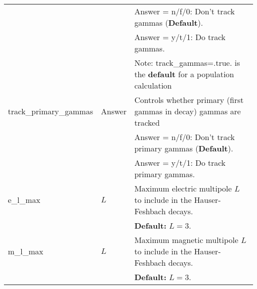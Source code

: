 \documentclass[
10pt,
showpacs,preprintnumbers,nofootinbib,
amsmath,amssymb,
aps,prc,groupedaddress,superscriptaddress,
notitlepage,showkeys
]{revtex4-1}
\begin{document}
\begin{center}
\begin{tabular}{| p{4cm} | p{4 cm} | p{9 cm} |}
 & &   Answer = n/f/0:  Don't track gammas  ({\bf Default}).\\
  & &  Answer = y/t/1:  Do track gammas.\\
 &  &  Note: track\_gammas=.true. is the {\bf default} for a population calculation\\
\hline
track\_primary\_gammas  & Answer  &      Controls whether primary (first gammas in decay) gammas are tracked \\
 & &    Answer = n/f/0:  Don't track primary gammas  ({\bf Default}).\\
 & &    Answer = y/t/1:  Do track primary gammas.\\
\hline
e\_l\_max & $L$ & Maximum electric multipole $L$ to include in the Hauser-Feshbach decays.\\
& & {\bf Default:} $L=3$.\\
\hline
m\_l\_max & $L$ & Maximum magnetic multipole $L$ to include in the Hauser-Feshbach decays.\\
& & {\bf Default:} $L=3$.\\
\hline
\end{tabular}
\end{center}
\end{document}
